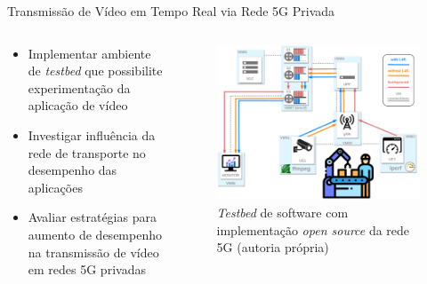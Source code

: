 \begin{frame}{Transmissão de Vídeo em Tempo Real via Rede 5G Privada}
    \begin{columns}
        \begin{column}{0.45\textwidth}
            \begin{itemize}
                \item Implementar ambiente de \textit{testbed} que possibilite experimentação da aplicação de vídeo
                \item Investigar influência da rede de transporte no desempenho das aplicações
                \item Avaliar estratégias para aumento de desempenho na transmissão de vídeo em redes 5G privadas
            \end{itemize}
        \end{column}
        \begin{column}{0.55\textwidth}
            \begin{figure}[htb]
                \centering
                \includegraphics[width=\textwidth]{figs/testbed_5G_privado.pdf}
                \caption{\textit{Testbed} de software com implementação \textit{open source} da rede 5G (autoria própria)}
            \end{figure} 
        \end{column}
    \end{columns}
\end{frame}
